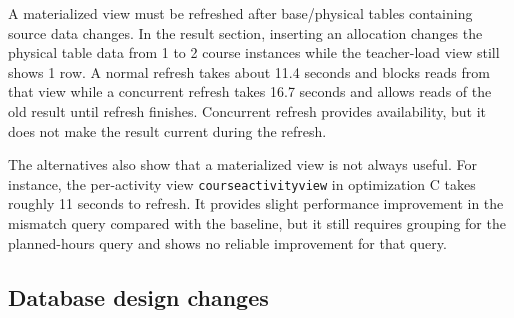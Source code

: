 \documentclass[a4paper]{scrartcl}
\renewcommand{\_}{\textunderscore\allowbreak}
\begin{document}

A materialized view must be refreshed after base/physical tables containing source data changes. In the result section, inserting an allocation changes the physical table data from 1 to 2 course instances while the teacher-load view still shows 1 row. A normal refresh takes about 11.4 seconds and blocks reads from that view while a concurrent refresh takes 16.7 seconds and allows reads of the old result until refresh finishes. Concurrent refresh provides availability, but it does not make the result current during the refresh. %

The alternatives also show that a materialized view is not always useful. For instance, the per-activity view \texttt{course\_activity\_view} in optimization C takes roughly 11 seconds to refresh. It provides slight performance improvement in the mismatch query compared with the baseline, but it still requires grouping for the planned-hours query and shows no reliable improvement for that query.


\subsection{Database design changes}
\end{document}
